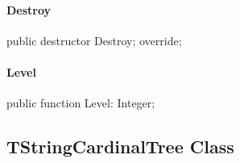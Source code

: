 \documentclass{report}
\newif\ifpdf
\begin{document}
\paragraph*{Destroy}\hspace*{\fill}

\label{PasDoc_HierarchyTree.TPasItemNode-Destroy}
\begin{list}{}{
\setlength{\itemindent}{0cm}
\setlength{\listparindent}{0cm}
\setlength{\leftmargin}{\evensidemargin}
\addtolength{\leftmargin}{\tmplength}
\settowidth{\labelsep}{X}
\addtolength{\leftmargin}{\labelsep}
\setlength{\labelwidth}{\tmplength}
}
\item[\textbf{Declaration}\hfill]
\ifpdf
\begin{flushleft}
\fi
\begin{ttfamily}
public destructor Destroy; override;\end{ttfamily}

\ifpdf
\end{flushleft}
\fi

\end{list}
\paragraph*{Level}\hspace*{\fill}

\label{PasDoc_HierarchyTree.TPasItemNode-Level}
\begin{list}{}{
\setlength{\itemindent}{0cm}
\setlength{\listparindent}{0cm}
\setlength{\leftmargin}{\evensidemargin}
\addtolength{\leftmargin}{\tmplength}
\settowidth{\labelsep}{X}
\addtolength{\leftmargin}{\labelsep}
\setlength{\labelwidth}{\tmplength}
}
\item[\textbf{Declaration}\hfill]
\ifpdf
\begin{flushleft}
\fi
\begin{ttfamily}
public function Level: Integer;\end{ttfamily}

\ifpdf
\end{flushleft}
\fi

\end{list}
\ifpdf
\subsection*{\large{\textbf{TStringCardinalTree Class}}\normalsize\hspace{1ex}\hrulefill}
\else
\end{document}
